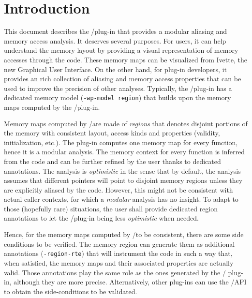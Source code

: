 \chapter{Introduction}
\label{cha-region-intro}

This document describes the \FramaC/\Region plug-in that provides a modular
aliasing and memory access analysis. It deserves several purposes. For \FramaC
users, it can help understand the memory layout by providing a visual
representation of memory accesses through the code. These memory maps can be
visualized from Ivette, the new \FramaC Graphical User Interface. On the other
hand, for \FramaC plug-in developers, it provides an rich collection of aliasing
and memory access properties that can be used to improve the precision of other
analyses. Typically, the \FramaC/\Wp plug-in has a dedicated memory model
(\verb$-wp-model region$) that builds upon the memory maps computed by the
\FramaC/\Region plug-in.

Memory maps computed by \FramaC/\Region are made of \emph{regions} that denotes
disjoint portions of the memory with consistent layout, access kinds and
properties (validity, initialization, etc.). The plug-in computes one memory map
for every function, hence it is a modular analysis. The memory context for every
function is inferred from the code and can be further refined by the user thanks
to dedicated \acsl annotations. The analysis is \emph{optimistic} in the sense
that by default, the analysis assumes that different pointers will point to
disjoint memory regions unless they are explicitly aliased by the code. However,
this might not be consistent with actual caller contexts, for which a
\emph{modular} analysis has no insight. To adapt to those (hopefully rare)
situations, the user shall provide dedicated region annotations to let
the \FramaC/\Region plug-in being less \emph{optimistic} when needed.

 Hence, for the memory maps computed by
\FramaC/\Region to be consistent, there are some side conditions to be verified.
The memory region can generate them as additional \acsl annotations
(\verb$-region-rte$) that will instrument the code in such a way that, when
satisfied, the memory maps and their associated properties are actually valid.
Those annotations play the same role as the ones generated by the \FramaC/\rte
plug-in, although they are more precise. Alternatively, other plug-ins can use
the \FramaC/\Region API to obtain the side-conditions to be validated.

